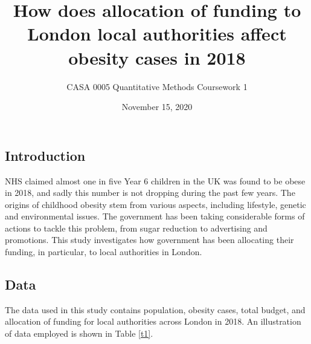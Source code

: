 \documentclass[12pt]{article}
\begin{document}
\title{How does allocation of funding to London local authorities affect obesity cases in 2018}
\author{CASA 0005 Quantitative Methods Coursework 1}
\date{November 15, 2020}
\maketitle
\subsection{Introduction}
NHS claimed almost one in five Year 6 children in the UK was found to be obese in 2018, and sadly this number is not dropping during the past few years. The origins of childhood obesity stem from various aspects, including lifestyle, genetic and environmental issues. The government has been taking considerable forms of actions to tackle this problem, from sugar reduction to advertising and promotions. This study investigates how government has been allocating their funding, in particular, to local authorities in London.


\subsection{Data}
The data used in this study contains population, obesity cases, total budget, and allocation of funding for local authorities across London in 2018. An illustration of data employed is shown in Table \eqref{t1}. 
\begin{table}[H]

\begin{center}
\captionsetup{font=scriptsize}
\caption{Illustration of data used, list of column names{} include: \newline
Names of local authority areas; total obesity cases in each area; total population; obesity density per 100 people (obesity cases divided by population multiplied by 100); total budget allocated (in pounds); percent of budget spent on improving air quality, cleaner environment, health training, raising school awareness, media awareness and subsiding counselling.
} \label{t1}
\end{center}
\end{table}
\end{document}
